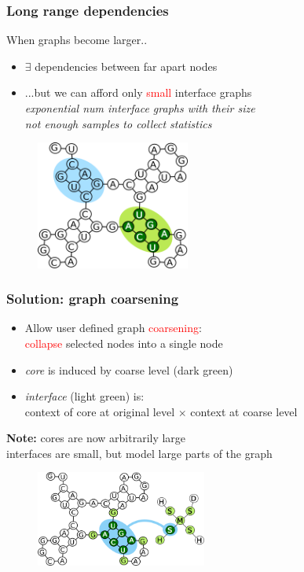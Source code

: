 \documentclass{beamer}
\newcommand{\red}[1]{\textcolor{red}{#1}}
\begin{document}
\begin{frame}
    \frametitle{Long range dependencies}
    When graphs become larger..
    \begin{itemize}
        \item $\exists$ dependencies between far apart nodes 
        \item ...but we can afford only \red{small} interface graphs  \\
        {\em exponential num interface graphs with their size} \\
        {\em not enough samples to collect statistics}
    \end{itemize}
   \begin{figure}[h!]
        \centering
        \includegraphics[width=0.45\textwidth]{images/longrangedep.png}
    \end{figure}
    
\end{frame}



\begin{frame}
    \frametitle{Solution: graph coarsening}
    \begin{itemize}
        \item Allow user defined graph \red{coarsening}:\\
        \red{collapse} selected nodes into a single node
        \item {\em core} is induced by coarse level (dark green)
        \item {\em interface} (light green) is: \\context of core at original level $\times$ context at coarse level
   \end{itemize}
    {\bf Note:} cores are now arbitrarily large\\
    interfaces are small, but model large parts of the graph
   \begin{figure}[ht]
        \centering
        \includegraphics[width=0.50\textwidth]{images/nucip.png}
    \end{figure}
   
\end{frame}
\end{document}

